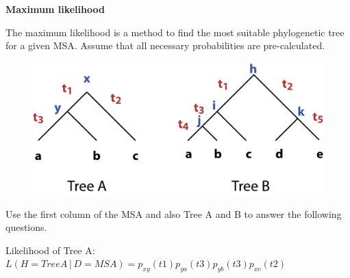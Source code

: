 \question \textbf{Maximum likelihood }

The maximum likelihood is a method to find the most suitable phylogenetic tree for a given MSA. Assume that all necessary probabilities are pre-calculated. \\

\begin{figure}[H]
      \centering
      \includegraphics[width=0.5 \textwidth]{fig09/maximum_likelihood.png}
\end{figure}

Use the first column of the MSA and also Tree A and B to answer the following questions.

Likelihood of Tree A: $L(H=Tree A│D=MSA) = p_{xy}(t1)p_{ya}(t3)p_{yb}(t3)p_{xc}(t2)$

\vspace{0.1 in}

